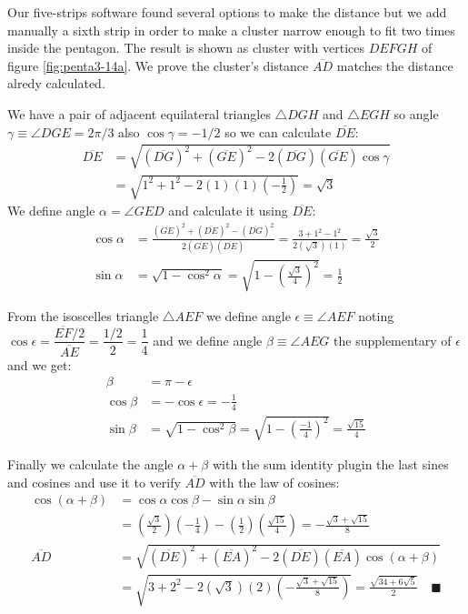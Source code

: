 \documentclass[11pt]{article}
\begin{document}
Our five-strips software found several options to make the distance but we add manually a sixth strip in order to make a cluster narrow enough to fit two times inside the pentagon. The result is shown as cluster with vertices $DEFGH$ of figure \ref{fig:penta3-14a}. We prove the cluster's distance $\overline{AD}$ matches the distance alredy calculated.

We have a pair of adjacent equilateral triangles $\triangle{DGH}$ and $\triangle{EGH}$ so angle $\gamma \equiv \angle{DGE} = 2\pi / 3$ also $\cos\gamma = - 1/2$ so we can calculate $\overline{DE}$:
\begin{align}
\overline{DE} &= \sqrt{(\overline{DG})^2 + (\overline{GE})^2 
 - 2(\overline{DG})(\overline{GE})\cos\gamma} \nonumber\\
 &= \sqrt{1^2 + 1^2 - 2(1)(1)\left(-\frac{1}2\right)} = \sqrt3
\end{align}
We define angle $\alpha = \angle{GED}$ and calculate it using $\overline{DE}$:
\begin{align}
\cos\alpha &= \frac{(\overline{GE})^2 + (\overline{DE})^2 - (\overline{DG})^2}
 {2(\overline{GE})(\overline{DE})}
 = \frac{3 + 1^2 - 1^2}{2(\sqrt3)(1)} = \frac{\sqrt3}2\\
\sin\alpha &= \sqrt{1 - \cos^2\alpha} = \sqrt{1 - \left(\frac{\sqrt3}4\right)^2} 
 = \frac{1}2
\end{align}

From the isoscelles triangle $\triangle{AEF}$ we define angle $\epsilon \equiv \angle{AEF}$ noting $\cos\epsilon = \dfrac{\overline{EF}/2}{\overline{AE}} = \dfrac{1/2}{2} = \dfrac{1}4$ and we define angle $\beta \equiv \angle{AEG}$ the supplementary of $\epsilon$ and we get:
\begin{align}
\beta &= \pi - \epsilon \nonumber\\
\cos\beta &= -\cos\epsilon = -\frac{1}4 \\
\sin\beta &= \sqrt{1 - \cos^2\beta} = \sqrt{1 - \left(\frac{-1}4\right)^2} = \frac{\sqrt{15}}4
\end{align}

Finally we calculate the angle $\alpha + \beta$ with the sum identity plugin the last sines and cosines and use it to verify $\overline{AD}$ with the law of cosines:
\begin{align}
\cos(\alpha + \beta) &= \cos\alpha\cos\beta - \sin\alpha\sin\beta \nonumber\\
 & = \left(\frac{\sqrt3}2\right)\left(-\frac{1}4\right) 
  - \left(\frac{1}2\right)\left(\frac{\sqrt{15}}4\right) 
  = -\frac{\sqrt3 + \sqrt{15}}8 \\
\overline{AD} &= \sqrt{(\overline{DE})^2 + (\overline{EA})^2 
 - 2(\overline{DE})(\overline{EA})\cos(\alpha + \beta)} \nonumber\\
 &= \sqrt{3 + 2^2 - 2(\sqrt3)(2)\left(-\frac{\sqrt3 + \sqrt{15}}8\right)} 
 = \frac{\sqrt{34 + 6\sqrt5}}2 \quad\blacksquare
\end{align}
\end{document}
